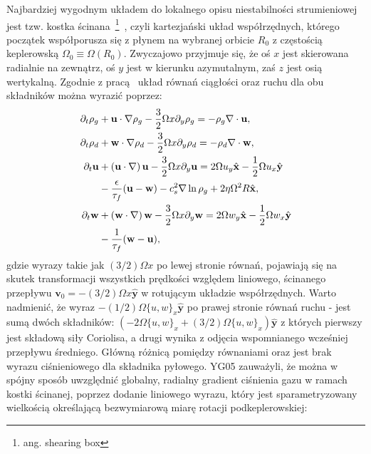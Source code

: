 Najbardziej wygodnym układem do lokalnego opisu niestabilności strumieniowej
jest tzw. kostka ścinana~\footnote{ang. shearing box}~\citep{HGB95}, czyli
kartezjański układ współrzędnych, którego początek współporusza się z płynem na
wybranej orbicie $R_0$ z częstością keplerowską $\Omega_0 \equiv
\Omega\left(R_0\right)$. Zwyczajowo przyjmuje się, że oś $x$ jest skierowana
radialnie na zewnątrz, oś $y$ jest w kierunku azymutalnym, zaś $z$ jest osią
wertykalną. Zgodnie z pracą~\cite*{YJ07} układ równań ciągłości oraz ruchu dla
obu składników można wyrazić poprzez:
%
\begin{align}
\partial_t \rho_g &+ \mathbf{u}\cdot\nabla\rho_g - \frac{3}{2}\Omega x\partial_y\rho_g 
 = -\rho_g\nabla\cdot\mathbf{u},\label{eqc1}\\
\partial_t \rho_d &+ \mathbf{w}\cdot\nabla\rho_d - \frac{3}{2}\Omega x\partial_y\rho_d 
 = -\rho_d\nabla\cdot\mathbf{w},\label{eqc2}\\
\partial_t \mathbf{u} &+ \left(\mathbf{u}\cdot\nabla\right)\mathbf{u} 
 - \frac{3}{2}\Omega x\partial_y\mathbf{u} 
 = 2\Omega u_y \hat{\mathbf{x}} -\frac{1}{2}\Omega u_x \hat{\mathbf{y}} \notag\\
 &- \frac{\epsilon}{\tau_f}(\mathbf{u}-\mathbf{w}) -c_s^2\nabla\ln\rho_g 
 +2\eta\Omega^2 R \hat{\mathbf{x}},\label{eqm1}\\
\partial_t \mathbf{w} &+ \left(\mathbf{w}\cdot\nabla\right)\mathbf{w} 
 - \frac{3}{2}\Omega x\partial_y\mathbf{w}
 = 2\Omega w_y \hat{\mathbf{x}} -\frac{1}{2}\Omega w_x \hat{\mathbf{y}} \notag\\
 &- \frac{1}{\tau_f}(\mathbf{w}-\mathbf{u}), \label{eqm2}
\end{align}
%
gdzie wyrazy takie jak $(3/2)\Omega x$ po lewej stronie równań, pojawiają się na
skutek transformacji wszystkich prędkości względem liniowego, ścinanego przepływu
$\mathbf{v}_0 = -(3/2)\Omega x \hat{\mathbf{y}}$ w rotującym układzie
współrzędnych. Warto nadmienić, że wyraz $-(1/2)\Omega \{u,w\}_x
\hat{\mathbf{y}}$ po prawej stronie równań ruchu - jest
sumą dwóch składników: $(-2\Omega \{u,w\}_x + (3/2)\Omega \{u,w\}_x)
\hat{\mathbf{y}}$ z których pierwszy jest składową siły Coriolisa, a drugi
wynika z odjęcia wspomnianego wcześniej przepływu średniego. Główną różnicą
pomiędzy równaniami  oraz  jest brak wyrazu ciśnieniowego
dla składnika pyłowego. YG05 zauważyli, że można w spójny sposób uwzględnić
globalny, radialny gradient ciśnienia gazu w ramach kostki ścinanej, poprzez
dodanie liniowego wyrazu, który jest sparametryzowany wielkością określającą
bezwymiarową miarę rotacji podkeplerowskiej:

